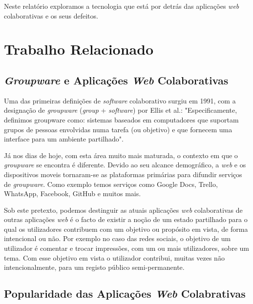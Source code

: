 \documentclass[runningheads]{llncs}
\begin{document}
        Neste relatório exploramos a tecnologia que está por detrás das
        aplicações {\itshape web} colaborativas e os seus defeitos.

    \section{Trabalho Relacionado}

        \subsection{{\itshape Groupware} e Aplicações {\itshape Web} Colaborativas}

        Uma das primeiras definições de {\itshape software} colaborativo surgiu em
        1991, com a designação de {\itshape groupware} ({\itshape group} +
        {\itshape software}) por Ellis et al.: "Especificamente, definimos
        groupware como: sistemas baseados em computadores que suportam grupos de
        pessoas envolvidas numa tarefa (ou objetivo) e que fornecem uma
        interface para um ambiente partilhado"\cite{groupware-def}. 

        Já nos dias de hoje, com esta área muito mais maturada, o contexto em que o
        {\itshape groupware} se encontra é diferente. Devido ao seu alcance
        demográfico, a {\itshape web} e os dispositivos moveis tornaram-se as
        plataformas primárias para difundir serviços de {\itshape groupware}.
        Como exemplo temos serviços como Google Docs, Trello,
        WhatsApp, Facebook, GitHub e muitos mais. 

        Sob este pretexto, podemos destinguir as atuais aplicações {\itshape
        web} colaborativas de outras aplicações {\itshape web} é o facto de
        existir a noção de um estado partilhado para o qual os utilizadores
        contribuem com um objetivo ou propósito em vista, de forma intencional
        ou não. Por exemplo no caso das redes sociais, o objetivo de um
        utilizador é comentar e trocar impressões, com um ou mais utilizadores,
        sobre um tema. Com esse objetivo em vista o utilizador contribui,
        muitas vezes não intencionalmente, para um registo público
        semi-permanente.

        \subsection{Popularidade das Aplicações {\itshape Web} Colabrativas}
\end{document}
